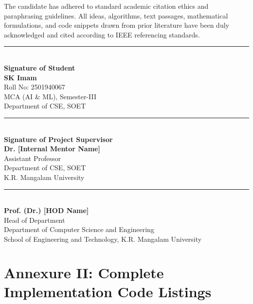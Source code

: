\vspace{0.6cm}
\noindent The candidate has adhered to standard academic citation ethics and paraphrasing guidelines. All ideas, algorithms, text passages, mathematical formulations, and code snippets drawn from prior literature have been duly acknowledged and cited according to IEEE referencing standards.

\vspace{2.5cm}
\noindent
\begin{minipage}[t]{0.48\textwidth}
    \rule{6cm}{0.6pt}\\[0.2cm]
    \textbf{Signature of Student}\\
    \textbf{SK Imam}\\
    Roll No: 2501940067\\
    MCA (AI \& ML), Semester-III\\
    Department of CSE, SOET
\end{minipage}
\hfill
\begin{minipage}[t]{0.48\textwidth}
    \begin{flushright}
        \rule{6cm}{0.6pt}\\[0.2cm]
        \textbf{Signature of Project Supervisor}\\
        \textbf{Dr. [Internal Mentor Name]}\\
        Assistant Professor\\
        Department of CSE, SOET\\
        K.R. Mangalam University
    \end{flushright}
\end{minipage}

\vspace{2.5cm}
\noindent
\begin{center}
    \rule{7cm}{0.6pt}\\[0.2cm]
    \textbf{Prof. (Dr.) [HOD Name]}\\
    Head of Department\\
    Department of Computer Science and Engineering\\
    School of Engineering and Technology, K.R. Mangalam University
\end{center}

\newpage
\chapter*{Annexure II: Complete Implementation Code Listings}
\label{annex:code_listings}

